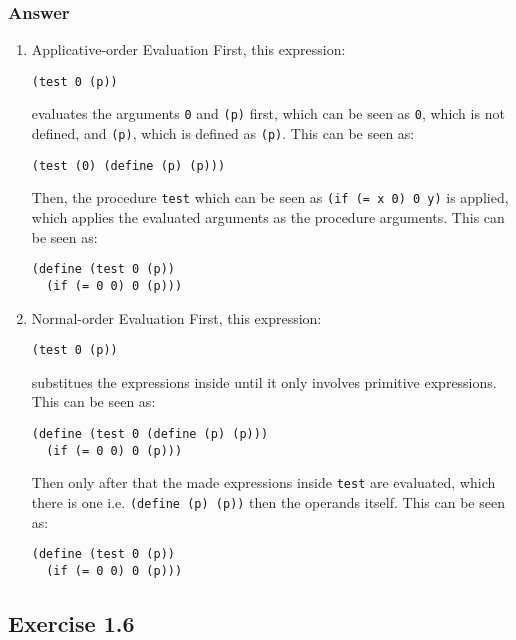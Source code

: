 \documentclass[11pt]{article}
\begin{document}
\subsubsection{Answer}
\label{sec:org086f003}
\begin{enumerate}
\item Applicative-order Evaluation
\label{sec:org0363d8d}
First, this expression:
\begin{verbatim}
(test 0 (p))
\end{verbatim}
evaluates the arguments \texttt{0} and \texttt{(p)} first,
which can be seen as \texttt{0}, which is not defined,
and \texttt{(p)}, which is defined as \texttt{(p)}. This can be
seen as:
\begin{verbatim}
(test (0) (define (p) (p)))
\end{verbatim}
Then, the procedure \texttt{test} which can be seen as \texttt{(if (= x 0) 0 y)} is applied,
which applies the evaluated arguments as the procedure arguments. This can be
seen as:
\begin{verbatim}
(define (test 0 (p))
  (if (= 0 0) 0 (p)))
\end{verbatim}

\item Normal-order Evaluation
\label{sec:org2e3bd4f}
First, this expression:
\begin{verbatim}
(test 0 (p))
\end{verbatim}
substitues the expressions inside until it only involves primitive expressions.
This can be seen as:
\begin{verbatim}
(define (test 0 (define (p) (p)))
  (if (= 0 0) 0 (p)))
\end{verbatim}
Then only after that the made expressions inside \texttt{test} are evaluated,
which there is one i.e. \texttt{(define (p) (p))} then the operands itself. 
This can be seen as:
\begin{verbatim}
(define (test 0 (p))
  (if (= 0 0) 0 (p)))
\end{verbatim}
\end{enumerate}

\subsection{Exercise 1.6}
\label{sec:orgedf1d14}
\end{document}
